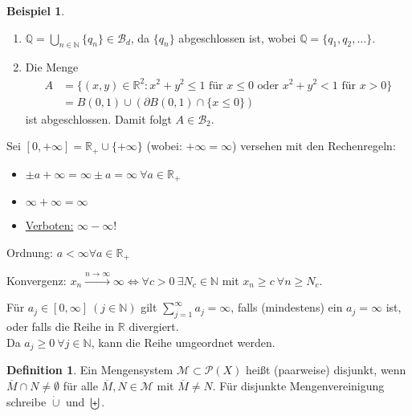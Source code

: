 \documentclass[a4paper]{scrreprt}
\newcommand{\PowerSet}{\mathcal{P}}
\newcommand{\R}{\mathbb{R}}
\newcommand{\N}{\mathbb{N}}
\newcommand{\Q}{\mathbb{Q}}
\newcommand{\Borel}{\mathcal{B}}
\newcommand{\Bd}{\Borel_d}
\newcommand{\dcup}{\dot{\cup}}
\newcommand{\bigdcup}{\biguplus}
\newcommand{\jspacesmall}{\vspace{4pt}}
\theoremstyle{plain}
\theoremstyle{definition}
\newtheorem*{defn*}{Definition}
\newtheorem*{expl*}{Beispiel}
\begin{document}
{{\begin{expl*}
    \begin{enumerate}
        \item $\Q = \bigcup_{n\in\N} \{q_n\} \in \Bd$, da $\{q_n\}$ abgeschlossen ist, wobei $\Q = \{q_1, q_2, \dots\}$.
        \item Die Menge 
        \begin{displaymath}
            \begin{split}
                A &= \{(x,y) \in \R^2 : x^2 + y^2 \le 1\text{ für }x \le 0\text{ oder }x^2 + y^2 < 1\text{ für }x > 0\}\\
                &= B(0,1) \cup (\partial B(0,1) \cap \{x\le 0\})
            \end{split}
        \end{displaymath}
        ist abgeschlossen. Damit folgt $A\in \Borel_2$.
    \end{enumerate}
\end{expl*}


Sei $[0, +\infty] = \R_+ \cup \{+\infty\}$ (wobei: $+\infty = \infty$) versehen mit den Rechenregeln:
\begin{itemize}
    \item $\pm a +\infty = \infty \pm a = \infty \ \forall a\in \R_+$
    \item $\infty + \infty = \infty$
    \item \uline{Verboten:} $\infty - \infty$!
\end{itemize}
Ordnung: $a < \infty \forall a \in \R_+$

\jspacesmall

Konvergenz: $x_n \xrightarrow{n\rightarrow \infty} \infty \Leftrightarrow \forall c>0\  \exists N_c \in \N$ mit $x_n \ge c\ \forall n \ge N_c$.

\jspacesmall

Für $a_j \in [0,\infty] \ (j \in \N)$ gilt $\sum_{j=1}^\infty a_j = \infty$, falls (mindestens) ein $a_j = \infty$ ist, oder falls die Reihe in $\R$ divergiert.\\
Da $a_j\ge 0 \ \forall j\in\N$, kann die Reihe umgeordnet werden.

\begin{defn*}
    Ein Mengensystem $\mathcal{M} \subset \PowerSet(X)$ heißt (paarweise) disjunkt, wenn $\overline{M} \cap N \ne \emptyset$ für alle $\overline{M}, N \in \mathcal{M}$ mit $\overline{M} \ne N$. Für disjunkte Mengenvereinigung schreibe $\dcup$ und $\bigdcup$.
\end{defn*}

}}
\end{document}
